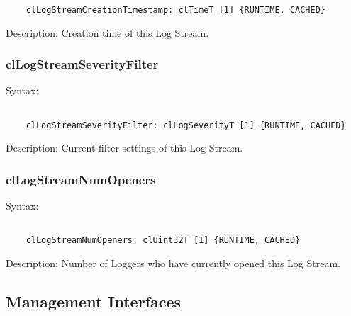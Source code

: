 \begin{flushleft}
\begin{Desc}
\begin{verbatim}
	clLogStreamCreationTimestamp: clTimeT [1] {RUNTIME, CACHED}
	\end{verbatim}
	\normalsize
\end{Desc}

\begin{Desc}
 \item[Description:]
Creation time of this Log Stream.
\end{Desc}



\subsubsection{clLogStreamSeverityFilter}
\begin{Desc}
\item[Syntax:]
\footnotesize\begin{verbatim}        	

	clLogStreamSeverityFilter: clLogSeverityT [1] {RUNTIME, CACHED}
	\end{verbatim}
	\normalsize
\end{Desc}

\begin{Desc}
 \item[Description:]
Current filter settings of this Log Stream.
\end{Desc}

\subsubsection{clLogStreamNumOpeners}
\begin{Desc}
\item[Syntax:]
\footnotesize\begin{verbatim}        	

	clLogStreamNumOpeners: clUint32T [1] {RUNTIME, CACHED}
	\end{verbatim}
	\normalsize
\end{Desc}

\begin{Desc}
 \item[Description:]
Number of Loggers who have currently opened this Log Stream.
\end{Desc}


\subsection{Management Interfaces}

\end{flushleft}
